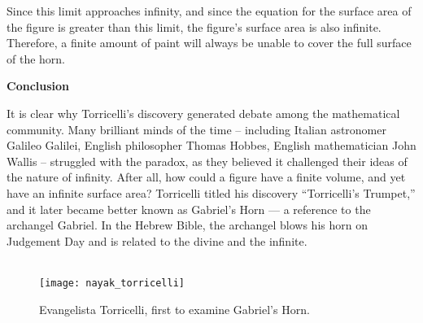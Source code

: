 Since this limit approaches infinity, and since the equation for the surface area of the figure is greater than this limit, the figure’s surface area is also infinite. Therefore, a finite amount of paint will always be unable to cover the full surface of the horn.

\noindent
\textbf{Conclusion}
	
	It is clear why Torricelli’s discovery generated debate among the mathematical community. Many brilliant minds of the time – including Italian astronomer Galileo Galilei, English philosopher Thomas Hobbes, English mathematician John Wallis – struggled with the paradox, as they believed it challenged their ideas of the nature of infinity. After all, how could a figure have a finite volume, and yet have an infinite surface area? Torricelli titled his discovery “Torricelli’s Trumpet,” and it later became better known as Gabriel’s Horn — a reference to the archangel Gabriel. In the Hebrew Bible, the archangel blows his horn on Judgement Day and is related to the divine and the infinite.\\\\
\renewcommand{\thefigure}{4}
\begin{figure}[h]
  \begin{center}
    \texttt{[image: nayak\_torricelli]}
  \end{center}
  \caption{Evangelista Torricelli, first to examine Gabriel's Horn.}
  \label{fig:4}
\end{figure}